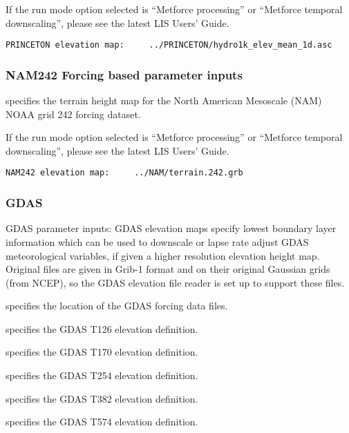  If the run mode option selected is ``Metforce processing'' or
 ``Metforce temporal downscaling'', please see the latest LIS Users'
 Guide.

 

 \begin{Verbatim}[frame=single]
PRINCETON elevation map:     ../PRINCETON/hydro1k_elev_mean_1d.asc
 \end{Verbatim}

 
 \subsubsection{NAM242 Forcing based parameter inputs}

  specifies the terrain height map
 for the North American Mesoscale (NAM) NOAA grid 242 forcing dataset.

 If the run mode option selected is ``Metforce processing'' or
 ``Metforce temporal downscaling'', please see the latest LIS Users'
 Guide.

 

 \begin{Verbatim}[frame=single]
NAM242 elevation map:     ../NAM/terrain.242.grb
 \end{Verbatim}

 
 \subsubsection{GDAS} \label{sssec:forcings_gdas}
 GDAS parameter inputs:  GDAS elevation maps specify lowest
 boundary layer information which can be used to downscale or
 lapse rate adjust GDAS meteorological variables, if given a higher 
 resolution elevation height map. Original files are given in
 Grib-1 format and on their original Gaussian grids (from NCEP), 
 so the GDAS elevation file reader is set up to support these files.

  specifies the location of the GDAS
 forcing data files.

  specifies the GDAS T126 elevation
 definition.

  specifies the GDAS T170 elevation
 definition.

  specifies the GDAS T254 elevation
 definition.

  specifies the GDAS T382 elevation
 definition.

  specifies the GDAS T574 elevation
 definition.

